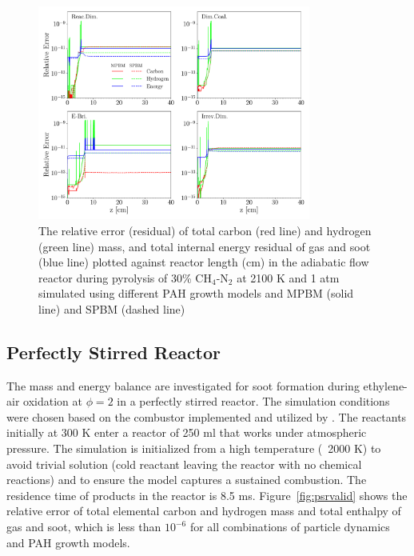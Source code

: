 \begin{figure}[H]
	\centering
	\includegraphics[width=0.8\textwidth]{Figures/Results/Validation/PFR/relerr_pfr.pdf}
	\caption{The relative error (residual) of total carbon (red line) and hydrogen (green line) mass, and total internal energy residual of gas and soot (blue line) plotted against reactor length (cm) in the adiabatic flow reactor during pyrolysis of 30\% $\mathrm{CH_4}$-$\mathrm{N_2}$ at 2100 K and 1 atm simulated using different PAH growth models and MPBM (solid line) and SPBM (dashed line)}
	\label{fig:pfrvalid}
\end{figure}

\subsection{Perfectly Stirred Reactor}
The mass and energy balance are investigated for soot formation during ethylene-air oxidation at $\phi=2$ in a perfectly stirred reactor. The simulation conditions were chosen based on the combustor implemented and utilized by \citet{stouffer2002combustion}. The reactants initially at 300 K enter a reactor of 250 ml that works under atmospheric pressure. The simulation is initialized from a high temperature (~2000 K) to avoid trivial solution (cold reactant leaving the reactor with no chemical reactions) and to ensure the model captures a sustained combustion. The residence time of products in the reactor is 8.5 ms. Figure~\ref{fig:psrvalid} shows the relative error of total elemental carbon and hydrogen mass and total enthalpy of gas and soot, which is less than $10^{-6}$ for all combinations of particle dynamics and PAH growth models.

